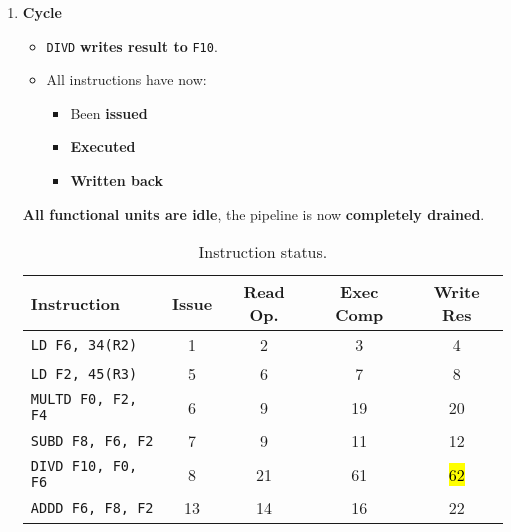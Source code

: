 \begin{enumerate}
    \newpage


    \item \textbf{Cycle \theenumi}
    \begin{itemize}
        \item[\textcolor{Green3}{\faIcon{check}}] \texttt{DIVD} \textbf{writes result to} \texttt{F10}.
        \item All instructions have now:
        \begin{itemize}
            \item Been \textbf{issued}
            \item \textbf{Executed}
            \item \textbf{Written back}
        \end{itemize}
    \end{itemize}
    \textbf{All functional units are idle}, the pipeline is now \textbf{completely drained}.

    \begin{table}[!htp]
        \centering
        \begin{tabular}{@{} l | c c c c @{}}
            \toprule
            Instruction                 & Issue     & Read Op.  & Exec Comp & Write Res \\
            \midrule
            \texttt{LD    F6, 34(R2)}   & 1         & 2         & 3         & 4         \\ [.3em]
            \texttt{LD    F2, 45(R3)}   & 5         & 6         & 7         & 8         \\ [.3em]
            \texttt{MULTD F0, F2, F4}   & 6         & 9         & 19        & 20        \\ [.3em]
            \texttt{SUBD  F8, F6, F2}   & 7         & 9         & 11        & 12        \\ [.3em]
            \texttt{DIVD  F10, F0, F6}  & 8         & 21        & 61        & \hl{62}   \\ [.3em]
            \texttt{ADDD  F6, F8, F2}   & 13        & 14        & 16        & 22        \\
            \bottomrule
        \end{tabular}
        \caption*{Instruction status.}
    \end{table}


\end{enumerate}
